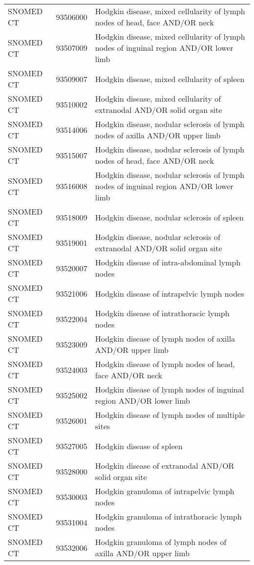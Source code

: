 \begin{longtable}{p{}p{}p{}}
  SNOMED CT & 93506000 & Hodgkin disease, mixed cellularity of lymph nodes of head, face AND/OR neck \\ 
  SNOMED CT & 93507009 & Hodgkin disease, mixed cellularity of lymph nodes of inguinal region AND/OR lower limb \\ 
  SNOMED CT & 93509007 & Hodgkin disease, mixed cellularity of spleen \\ 
  SNOMED CT & 93510002 & Hodgkin disease, mixed cellularity of extranodal AND/OR solid organ site \\ 
  SNOMED CT & 93514006 & Hodgkin disease, nodular sclerosis of lymph nodes of axilla AND/OR upper limb \\ 
  SNOMED CT & 93515007 & Hodgkin disease, nodular sclerosis of lymph nodes of head, face AND/OR neck \\ 
  SNOMED CT & 93516008 & Hodgkin disease, nodular sclerosis of lymph nodes of inguinal region AND/OR lower limb \\ 
  SNOMED CT & 93518009 & Hodgkin disease, nodular sclerosis of spleen \\ 
  SNOMED CT & 93519001 & Hodgkin disease, nodular sclerosis of extranodal AND/OR solid organ site \\ 
  SNOMED CT & 93520007 & Hodgkin disease of intra-abdominal lymph nodes \\ 
  SNOMED CT & 93521006 & Hodgkin disease of intrapelvic lymph nodes \\ 
  SNOMED CT & 93522004 & Hodgkin disease of intrathoracic lymph nodes \\ 
  SNOMED CT & 93523009 & Hodgkin disease of lymph nodes of axilla AND/OR upper limb \\ 
  SNOMED CT & 93524003 & Hodgkin disease of lymph nodes of head, face AND/OR neck \\ 
  SNOMED CT & 93525002 & Hodgkin disease of lymph nodes of inguinal region AND/OR lower limb \\ 
  SNOMED CT & 93526001 & Hodgkin disease of lymph nodes of multiple sites \\ 
  SNOMED CT & 93527005 & Hodgkin disease of spleen \\ 
  SNOMED CT & 93528000 & Hodgkin disease of extranodal AND/OR solid organ site \\ 
  SNOMED CT & 93530003 & Hodgkin granuloma of intrapelvic lymph nodes \\ 
  SNOMED CT & 93531004 & Hodgkin granuloma of intrathoracic lymph nodes \\ 
  SNOMED CT & 93532006 & Hodgkin granuloma of lymph nodes of axilla AND/OR upper limb \\ 

\end{longtable}
